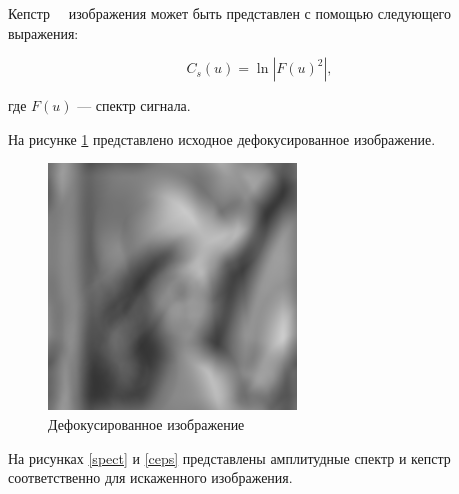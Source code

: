 Кепстр~\cite{cepstrr}~\cite{ceps} изображения может быть представлен с помощью следующего выражения:

\begin{equation}
	C_s(u) = \ln|F(u)^2|,
\end{equation}

где $F(u)$ --- спектр сигнала.

\clearpage

На рисунке \ref{defocus_lena} представлено исходное дефокусированное изображение.

\begin{figure}[H]
	\centering
	\includegraphics[scale=0.7]{assets/defocus}
	\caption{Дефокусированное изображение}
	\label{defocus_lena}
\end{figure}

На рисунках \ref{spect} и \ref{ceps} представлены амплитудные спектр и кепстр соответственно для искаженного изображения.

